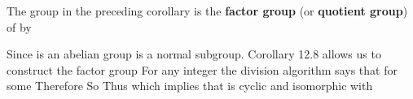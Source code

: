 \documentclass[11pt,oneside]{article}
\begin{document}
\begin{BookBody}
 The group  in the preceding corollary is the\textbf{ factor group} (or\textbf{ quotient group}) of  by \BookEnd{\blacksquare}

 Since  is an abelian group is a normal subgroup. Corollary 12.8 allows us to construct the factor group  For any integer  the division algorithm says that  for some  Therefore So   Thus  which implies that  is cyclic and isomorphic with  \BookEnd{\blacktriangle}

\end{BookBody}

\BookNarrativetrue
\end{document}
